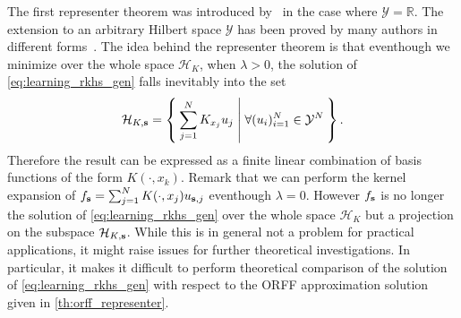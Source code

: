 The first representer theorem was introduced by~\citet{Wahba90} in the
case where $\mathcal{Y}=\mathbb{R}$. The extension to an arbitrary Hilbert
space $\mathcal{Y}$ has been proved by many authors in different
forms~\citep{Brouard2011,kadri2015operator,Micchelli2005}. The idea behind the
representer theorem is that eventhough we minimize over the whole space
$\mathcal{H}_K$, when $\lambda>0$, the solution of
\cref{eq:learning_rkhs_gen} falls inevitably into the set
\begin{dmath*}
    \mathcal{H}_{K, \seq{s}}=\Set{\sum_{j=1}^{N}K_{x_j}u_j| \forall
    (u_i)_{i=1}^{N} \in\mathcal{Y}^{N}}.
\end{dmath*}
Therefore the result can be expressed as a finite linear combination of basis
functions of the form $K(\cdot,x_k)$. Remark that we can perform the kernel
expansion of $f_{\boldsymbol{\mathbf{s}}}=\sum_{j=1}^{N}K(\cdot,x_j)u_{\boldsymbol{\mathbf{s}},j}$ eventhough
$\lambda=0$. However $f_{\boldsymbol{\mathbf{s}}}$ is no longer the solution of
\cref{eq:learning_rkhs_gen} over the whole space $\mathcal{H}_K$ but a
projection on the subspace $\mathcal{H}_{K, \boldsymbol{\mathbf{s}}}$. While this is in general
not a problem for practical applications, it might raise issues for further
theoretical investigations. In particular, it makes it difficult to perform
theoretical comparison of the  solution of
\cref{eq:learning_rkhs_gen} with respect to the \acs{ORFF} approximation
solution given in \cref{th:orff_representer}.

